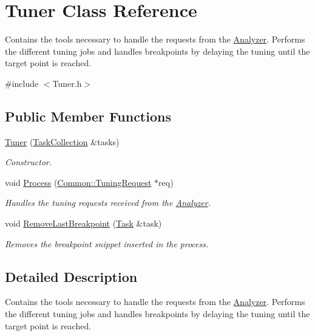 \hypertarget{class_tuner}{\section{Tuner Class Reference}
\label{class_tuner}
}


Contains the tools necessary to handle the requests from the \hyperlink{class_analyzer}{Analyzer}. Performs the different tuning jobs and handles breakpoints by delaying the tuning until the target point is reached.  




{\ttfamily \#include $<$Tuner.\-h$>$}

\subsection*{Public Member Functions}
\begin{DoxyCompactItemize}
\item 
\hyperlink{class_tuner_a83a645b0a50c00ed9660c61c4536104a}{Tuner} (\hyperlink{class_task_collection}{Task\-Collection} \&tasks)
\begin{DoxyCompactList}\small\item\em Constructor. \end{DoxyCompactList}\item 
void \hyperlink{class_tuner_aef720f1354b4d8ec43ef79fb2aaffac1}{Process} (\hyperlink{class_common_1_1_tuning_request}{Common\-::\-Tuning\-Request} $\ast$req)
\begin{DoxyCompactList}\small\item\em Handles the tuning requests received from the \hyperlink{class_analyzer}{Analyzer}. \end{DoxyCompactList}\item 
void \hyperlink{class_tuner_a1d78518d27a143232ef68a962c070462}{Remove\-Last\-Breakpoint} (\hyperlink{class_task}{Task} \&task)
\begin{DoxyCompactList}\small\item\em Removes the breakpoint snippet inserted in the process. \end{DoxyCompactList}\end{DoxyCompactItemize}


\subsection{Detailed Description}
Contains the tools necessary to handle the requests from the \hyperlink{class_analyzer}{Analyzer}. Performs the different tuning jobs and handles breakpoints by delaying the tuning until the target point is reached. 

